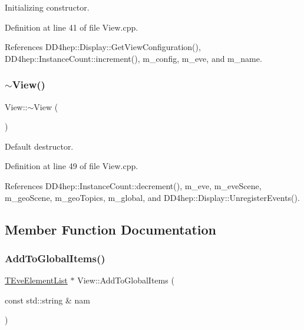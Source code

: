 Initializing constructor. 



Definition at line 41 of file View.\+cpp.



References D\+D4hep\+::\+Display\+::\+Get\+View\+Configuration(), D\+D4hep\+::\+Instance\+Count\+::increment(), m\+\_\+config, m\+\_\+eve, and m\+\_\+name.

\hypertarget{class_d_d4hep_1_1_view_ad0dc854db9aabbea98a334dec89f785c}{}\label{class_d_d4hep_1_1_view_ad0dc854db9aabbea98a334dec89f785c} 
\subsubsection{\texorpdfstring{$\sim$\+View()}{~View()}}
{\footnotesize\ttfamily View\+::$\sim$\+View (\begin{DoxyParamCaption}{ }\end{DoxyParamCaption})\hspace{0.3cm}{\ttfamily [virtual]}}



Default destructor. 



Definition at line 49 of file View.\+cpp.



References D\+D4hep\+::\+Instance\+Count\+::decrement(), m\+\_\+eve, m\+\_\+eve\+Scene, m\+\_\+geo\+Scene, m\+\_\+geo\+Topics, m\+\_\+global, and D\+D4hep\+::\+Display\+::\+Unregister\+Events().



\subsection{Member Function Documentation}
\hypertarget{class_d_d4hep_1_1_view_a2fec7a94942a0a6f7c0225ea11a6c212}{}\label{class_d_d4hep_1_1_view_a2fec7a94942a0a6f7c0225ea11a6c212} 
\subsubsection{\texorpdfstring{Add\+To\+Global\+Items()}{AddToGlobalItems()}}
{\footnotesize\ttfamily \hyperlink{class_t_eve_element_list}{T\+Eve\+Element\+List} $\ast$ View\+::\+Add\+To\+Global\+Items (\begin{DoxyParamCaption}\item[{const std\+::string \&}]{nam }\end{DoxyParamCaption})\hspace{0.3cm}{\ttfamily [virtual]}}



